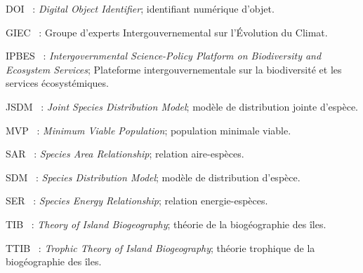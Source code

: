 \listeabrev
\begin{liste}

\item[DOI]~: \textit{Digital Object Identifier}; identifiant numérique d'objet.

\item[GIEC]~: Groupe d'experts Intergouvernemental sur l'Évolution du Climat.

\item[IPBES]~: \textit{Intergovernmental Science-Policy Platform on Biodiversity and Ecosystem Services}; Plateforme intergouvernementale sur la biodiversité et les services écosystémiques.

\item[JSDM]~: \textit{Joint Species Distribution Model}; modèle de distribution jointe d'espèce.

\item[MVP]~: \textit{Minimum Viable Population}; population minimale viable.

\item[SAR]~: \textit{Species Area Relationship}; relation aire-espèces.

\item[SDM]~: \textit{Species Distribution Model}; modèle de distribution d'espèce.

\item[SER]~: \textit{Species Energy Relationship}; relation energie-espèces.

\item[TIB]~: \textit{Theory of Island Biogeography}; théorie de la biogéographie des îles.

\item[TTIB]~: \textit{Trophic Theory of Island Biogeography}; théorie trophique de la biogéographie des îles.

\end{liste}




%
%


